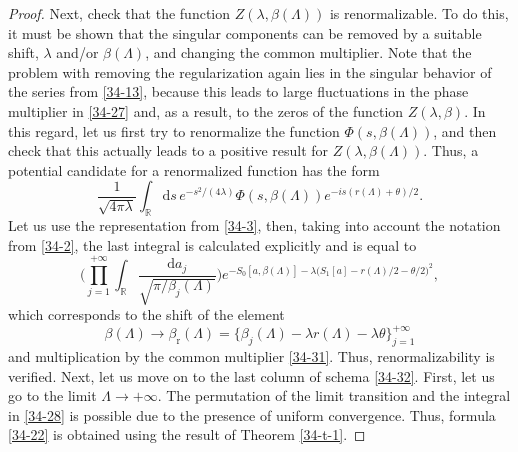 \documentclass[a4paper]{article}
\begin{document}
\begin{proof}
Next, check that the function $Z(\lambda,\beta(\Lambda))$ is renormalizable. To do this, it must be shown that the singular components can be removed by a suitable shift, $\lambda$ and/or $\beta(\Lambda)$, and changing the common multiplier. Note that the problem with removing the regularization again lies in the singular behavior of the series from \eqref{34-13}, because this leads to large fluctuations in the phase multiplier in \eqref{34-27} and, as a result, to the zeros of the function $Z(\lambda,\beta)$. In this regard, let us first try to renormalize the function $\Phi(s,\beta(\Lambda))$, and then check that this actually leads to a positive result for $Z(\lambda,\beta(\Lambda))$. Thus, a potential candidate for a renormalized function has the form
\begin{equation}\label{34-28}
\frac{1}{\sqrt{4\pi\lambda}}
\int_{\mathbb{R}}\mathrm{d}s\,e^{-s^2/(4\lambda)}\Phi(s,\beta(\Lambda))e^{-is(r(\Lambda)+\theta)/2}.
\end{equation}
Let us use the representation from \eqref{34-3}, then, taking into account the notation from \eqref{34-2}, the last integral is calculated explicitly and is equal to
\begin{equation}\label{34-29}
\Bigg(\prod_{j=1}^{+\infty}\int_{\mathbb{R}}\frac{\mathrm{d}a_j}{\sqrt{\pi/\beta_j(\Lambda)}}\Bigg)
e^{-S_0[a,\beta(\Lambda)]-\lambda\big(S_1[a]-r(\Lambda)/2-\theta/2\big)^2},
\end{equation}
which corresponds to the shift of the element
\begin{equation}\label{34-30}
\beta(\Lambda)\to\beta_{\mathrm{r}}(\Lambda)=\{\beta_j(\Lambda)-\lambda r(\Lambda)-\lambda \theta\}_{j=1}^{+\infty}
\end{equation}
and multiplication by the common multiplier \eqref{34-31}.
Thus, renormalizability is verified. Next, let us move on to the last column of schema \eqref{34-32}. First, let us go to the limit $\Lambda\to+\infty$. The permutation of the limit transition and the integral in \eqref{34-28} is possible due to the presence of uniform convergence. Thus, formula \eqref{34-22} is obtained using the result of Theorem \ref{34-t-1}. 


\end{proof}
\end{document}
